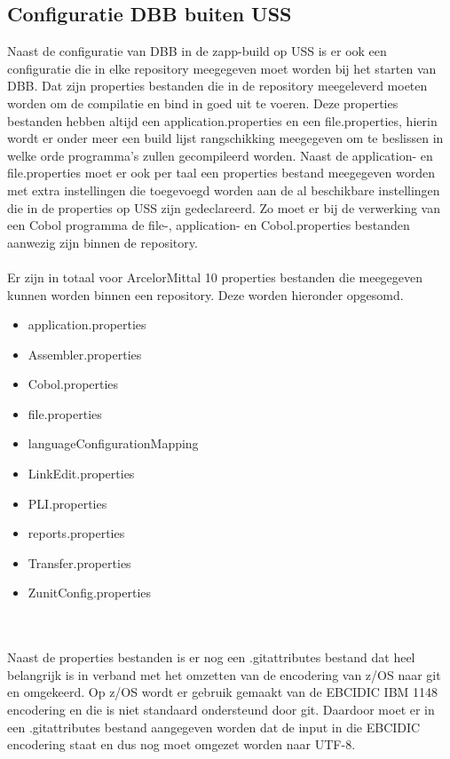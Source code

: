 \subsection{Configuratie DBB buiten USS}
Naast de configuratie van DBB in de zapp-build op USS is er ook een configuratie die in elke repository meegegeven moet worden bij het starten van DBB. Dat zijn properties bestanden die in de repository meegeleverd moeten worden om de compilatie en bind in goed uit te voeren. Deze properties bestanden hebben altijd een application.properties en een file.properties, hierin wordt er onder meer een build lijst rangschikking meegegeven om te beslissen in welke orde programma's zullen gecompileerd worden. Naast de application- en file.properties moet er ook per taal een properties bestand meegegeven worden met extra instellingen die toegevoegd worden aan de al beschikbare instellingen die in de properties op USS zijn gedeclareerd. Zo moet er bij de verwerking van een Cobol programma de file-, application- en Cobol.properties bestanden aanwezig zijn binnen de repository. 
\\ \\
Er zijn in totaal voor ArcelorMittal 10 properties bestanden die meegegeven kunnen worden binnen een repository. Deze worden hieronder opgesomd.
\begin{multicols}{2}
    \begin{itemize}
        \item application.properties
        \item Assembler.properties
        \item Cobol.properties
        \item file.properties
        \item languageConfigurationMapping
        \item LinkEdit.properties
        \item PLI.properties
        \item reports.properties
        \item Transfer.properties
        \item ZunitConfig.properties
    \end{itemize}
\end{multicols}
\\ \\
Naast de properties bestanden is er nog een .gitattributes bestand dat heel belangrijk is in verband met het omzetten van de encodering van z/OS naar git en omgekeerd. Op z/OS wordt er gebruik gemaakt van de EBCIDIC IBM 1148 encodering en die is niet standaard ondersteund door git. Daardoor moet er in een .gitattributes bestand aangegeven worden dat de input in die EBCIDIC encodering staat en dus nog moet omgezet worden naar UTF-8. 
\\ \\








